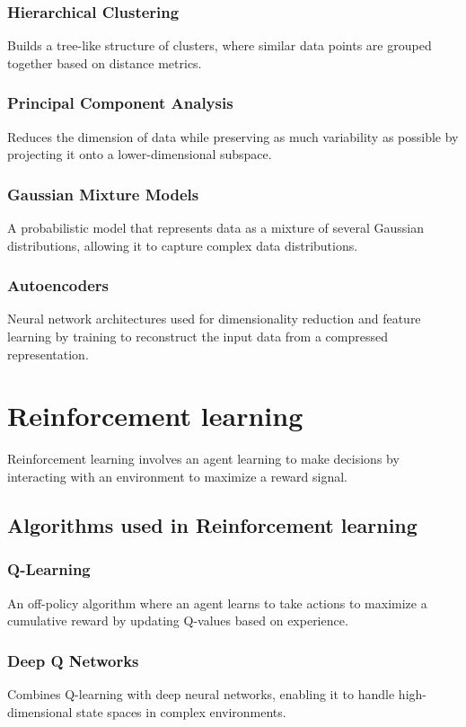 \documentclass[12pt]{article}
\begin{document}
 \subsubsection{Hierarchical Clustering}
Builds a tree-like structure of clusters, where similar data points are grouped together based on distance metrics.

 \subsubsection{Principal Component Analysis} 
Reduces the dimension of data while preserving as much variability as possible by projecting it onto a lower-dimensional subspace.

 \subsubsection{Gaussian Mixture Models} 
A probabilistic model that represents data as a mixture of several Gaussian distributions, allowing it to capture complex data distributions.

 \subsubsection{Autoencoders}
Neural network architectures used for dimensionality reduction and feature learning by training to reconstruct the input data from a compressed representation.

\section{Reinforcement learning}
Reinforcement learning involves an agent learning to make decisions by interacting with an environment to maximize a reward signal.

\subsection{Algorithms used in Reinforcement learning}
 \subsubsection{Q-Learning}
 An off-policy algorithm where an agent learns to take actions to maximize a cumulative reward by updating Q-values based on experience.

 \subsubsection{Deep Q Networks} 
Combines Q-learning with deep neural networks, enabling it to handle high-dimensional state spaces in complex environments.
\end{document}
